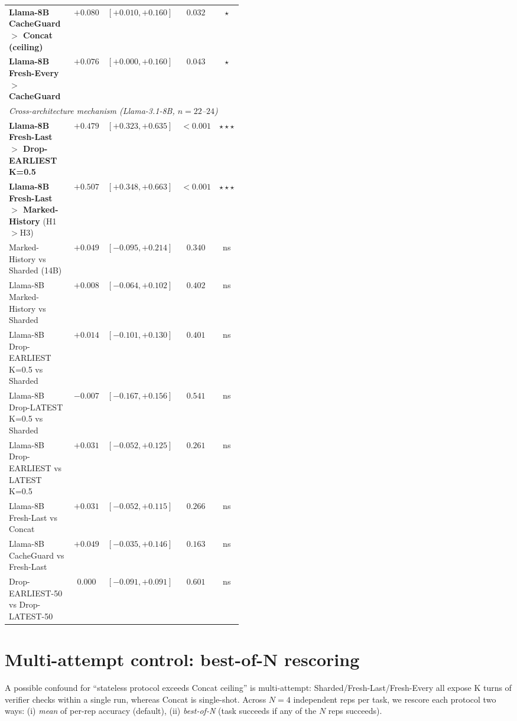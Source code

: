 \documentclass{article}
\begin{document}
\begin{table}[h]
\begin{tabular}{p{0.46\linewidth}cccc}
\textbf{Llama-8B CacheGuard $>$ Concat (ceiling)} & $+0.080$ & $[+0.010, +0.160]$ & $0.032$ & $\star$ \\
\textbf{Llama-8B Fresh-Every $>$ CacheGuard} & $+0.076$ & $[+0.000, +0.160]$ & $0.043$ & $\star$ \\
\midrule
\multicolumn{5}{l}{\textit{Cross-architecture mechanism (Llama-3.1-8B, $n=22$--$24$)}} \\
\textbf{Llama-8B Fresh-Last $>$ Drop-EARLIEST K=0.5} & $+0.479$ & $[+0.323, +0.635]$ & $<0.001$ & $\star\star\star$ \\
\textbf{Llama-8B Fresh-Last $>$ Marked-History} (H1$>$H3) & $+0.507$ & $[+0.348, +0.663]$ & $<0.001$ & $\star\star\star$ \\
\midrule
Marked-History vs Sharded (14B) & $+0.049$ & $[-0.095, +0.214]$ & $0.340$ & ns \\
Llama-8B Marked-History vs Sharded & $+0.008$ & $[-0.064, +0.102]$ & $0.402$ & ns \\
Llama-8B Drop-EARLIEST K=0.5 vs Sharded & $+0.014$ & $[-0.101, +0.130]$ & $0.401$ & ns \\
Llama-8B Drop-LATEST K=0.5 vs Sharded & $-0.007$ & $[-0.167, +0.156]$ & $0.541$ & ns \\
Llama-8B Drop-EARLIEST vs LATEST K=0.5 & $+0.031$ & $[-0.052, +0.125]$ & $0.261$ & ns \\
Llama-8B Fresh-Last vs Concat & $+0.031$ & $[-0.052, +0.115]$ & $0.266$ & ns \\
Llama-8B CacheGuard vs Fresh-Last & $+0.049$ & $[-0.035, +0.146]$ & $0.163$ & ns \\
Drop-EARLIEST-50 vs Drop-LATEST-50 & $0.000$ & $[-0.091, +0.091]$ & $0.601$ & ns \\
\bottomrule
\end{tabular}
\end{table}

\section{Multi-attempt control: best-of-N rescoring}
\label{app:bestofN}

A possible confound for ``stateless protocol exceeds Concat ceiling'' is multi-attempt: Sharded/Fresh-Last/Fresh-Every all expose K turns of verifier checks within a single run, whereas Concat is single-shot. Across $N=4$ independent reps per task, we rescore each protocol two ways: (i) \emph{mean} of per-rep accuracy (default), (ii) \emph{best-of-N} (task succeeds if any of the $N$ reps succeeds).
\end{document}
